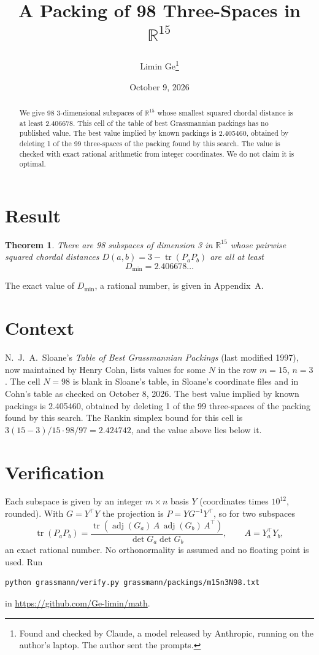 \documentclass[11pt,a4paper]{article}
\title{A Packing of 98 Three-Spaces in $\mathbb{R}^{15}$}
\author{Limin Ge\thanks{Found and checked by Claude, a model released by Anthropic, running on the author's laptop. The author sent the prompts.}}
\date{October 9, 2026}
\newtheorem*{theorem}{Theorem}
\begin{document}
\maketitle
\begin{abstract}
We give 98 3-dimensional subspaces of $\mathbb{R}^{15}$ whose smallest squared chordal distance is at least 2.406678. This cell of the table of best Grassmannian packings has no published value. The best value implied by known packings is 2.405460, obtained by deleting 1 of the 99 three-spaces of the packing found by this search. The value is checked with exact rational arithmetic from integer coordinates. We do not claim it is optimal.
\end{abstract}

\section{Result}
\begin{theorem}
There are 98 subspaces of dimension 3 in $\mathbb{R}^{15}$ whose pairwise squared chordal distances $D(a,b) = 3 - \operatorname{tr}(P_aP_b)$ are all at least
\[ D_{\min} = 2.406678\ldots \]
\end{theorem}
The exact value of $D_{\min}$, a rational number, is given in Appendix~A.


\section{Context}
N.~J.~A.~Sloane's \emph{Table of Best Grassmannian Packings} (last modified 1997), now maintained by Henry Cohn, lists values for some $N$ in the row $m=15$, $n=3$. The cell $N=98$ is blank in Sloane's table, in Sloane's coordinate files and in Cohn's table as checked on October 8, 2026. The best value implied by known packings is 2.405460, obtained by deleting 1 of the 99 three-spaces of the packing found by this search. The Rankin simplex bound for this cell is $3(15-3)/15\cdot 98/97 = 2.424742$, and the value above lies below it.


\section{Verification}
Each subspace is given by an integer $m\times n$ basis $Y$ (coordinates times $10^{12}$, rounded). With $G=Y^\top Y$ the projection is $P=YG^{-1}Y^\top$, so for two subspaces
\[ \operatorname{tr}(P_aP_b)=\frac{\operatorname{tr}(\operatorname{adj}(G_a)\,A\,\operatorname{adj}(G_b)\,A^\top)}{\det G_a\det G_b},\qquad A=Y_a^\top Y_b, \]
an exact rational number. No orthonormality is assumed and no floating point is used. Run
\begin{verbatim}
python grassmann/verify.py grassmann/packings/m15n3N98.txt
\end{verbatim}
in \url{https://github.com/Ge-limin/math}.
\end{document}
